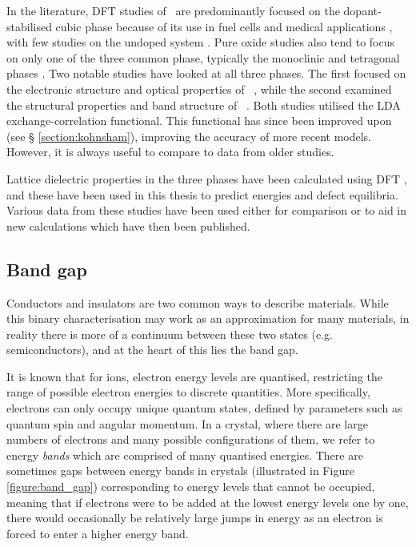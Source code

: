 In the literature, DFT studies of \zirconia\ are predominantly focused on the dopant-stabilised cubic phase because of its use in fuel cells and medical applications \cite{orera1990intrinsic,jiang2011first}, with few studies on the undoped system \cite{mackrodt1986theoretical,aarhammar2009energetics}. Pure oxide studies also tend to focus on only one of the three common phase, typically the monoclinic \cite{zheng2007first,foster2002modelling,foster2001structure} and tetragonal phases \cite{Gionco2013, Eichler2004, Zhang2014}. Two notable studies have looked at all three phases. The first focused on the electronic structure and optical properties of \zirconia\ \cite{French1994}, while the second examined the structural properties and band structure of \zirconia\ \cite{Kralik1998}. Both studies utilised the LDA exchange-correlation functional. This functional has since been improved upon (see § \ref{section:kohnsham}), improving the accuracy of more recent models. However, it is always useful to compare to data from older studies. 

Lattice dielectric properties in the three phases have been calculated using DFT \cite{Zhao2002a}, and these have been used in this thesis to predict energies and defect equilibria. Various data from these studies have been used either for comparison or to aid in new calculations which have then been published.

\subsection{Band gap}

Conductors and insulators are two common ways to describe materials. While this binary characterisation may work as an approximation for many materials, in reality there is more of a continuum between these two states (e.g. semiconductors), and at the heart of this lies the band gap.

It is known that for ions, electron energy levels are quantised, restricting the range of possible electron energies to discrete quantities. More specifically, electrons can only occupy unique quantum states, defined by parameters such as quantum spin and angular momentum. In a crystal, where there are large numbers of electrons and many possible configurations of them, we refer to energy \emph{bands} which are comprised of many quantised energies. There are sometimes gaps between energy bands in crystals (illustrated in Figure \ref{figure:band_gap}) corresponding to energy levels that cannot be occupied, meaning that if electrons were to be added at the lowest energy levels one by one, there would occasionally be relatively large jumps in energy as an electron is forced to enter a higher energy band. 

